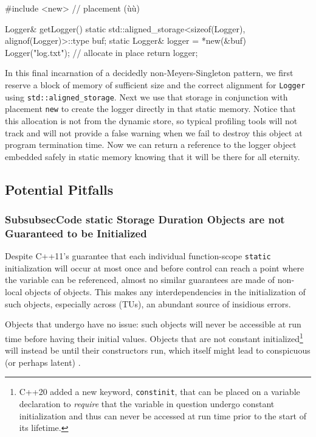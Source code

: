 \begin{emcppslisting}[emcppsbatch=e13]
#include <new>  // placement (ù{}ù)

Logger& getLogger()
{
    static std::aligned_storage<sizeof(Logger), alignof(Logger)>::type buf;
    static Logger& logger = *new(&buf) Logger("log.txt");  // allocate in place
    return logger;
}
\end{emcppslisting}

\noindent In this final incarnation of a decidedly non-Meyers-Singleton pattern,
we first reserve a block of memory of sufficient size and the correct
alignment for \lstinline!Logger! using \linebreak[4]%
\lstinline!std::aligned_storage!. Next
we use that storage in conjunction with placement \lstinline!new! to create
the logger directly in that static memory. Notice that this allocation
is not from the dynamic store, so typical profiling tools will not track
and will not provide a false warning when we fail to destroy this object
at program termination time. Now we can return a reference to the logger
object embedded safely in static memory knowing that it will be there
for all eternity.

\subsection[Potential Pitfalls]{Potential Pitfalls}\label{potential-pitfalls-functionstatic}

\subsubsection[\tt{static} Storage Duration Objects are not Guaranteed to be Initialized]{{SubsubsecCode static} Storage Duration Objects are not Guaranteed to be Initialized}\label{static-storage duration-objects-are-not-guaranteed-to-be-initialized}

Despite C++11's guarantee that each individual function-scope
\lstinline!static! initialization will occur at most once and before control can reach
a point where the variable can be referenced, almost no similar
guarantees are made of non-local objects of  objects.
This makes any interdependencies in the initialization of such objects, especially across
 (TUs), an abundant source of insidious
errors.

Objects that undergo  have no issue:
such objects will never be accessible at run time before having their
initial values. Objects that are not constant
initialized{\cprotect\footnote{C++20 added a new keyword,
\lstinline!constinit!, that can be placed on a variable declaration to
\emph{require} that the variable in question undergo constant
initialization and thus can never be accessed at run time prior to the
  start of its lifetime.}} will instead be 
until their constructors run, which itself might lead to conspicuous (or
perhaps latent) .

